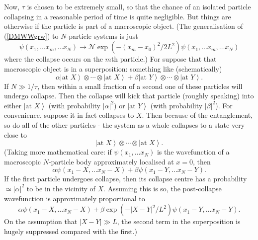 \documentclass[12pt]{article}
\newcommand{\be}{\begin{equation}}
\newcommand{\ee}{\end{equation}}
\newcommand{\mc}[1]{\ensuremath{\mathcal{#1}}}
\newcommand{\ket}[1]{\ensuremath{\left|  #1 \right\rangle}}
\begin{document}
Now, $\tau$ is chosen to be extremely small, so that the chance of an isolated particle collapsing in a reasonable period of time is quite negligible. But things are otherwise if the particle is part of a macroscopic object. (The generalisation of (\ref{DMWWgrw}) to $N$-particle systems is just
\be\label{DMWWgrw2}
\psi(x_1,\ldots x_m, \ldots x_N)\longrightarrow \mc{N}\exp(-(x_m-x_0)^2/2L^2) \psi(x_1,\ldots x_m, \ldots x_N)
\ee 
where the collapse occurs on the $m$th particle.) For suppose that that macroscopic object is in a superposition: something like (schematically)
\be
\alpha \ket{\mathrm{\mbox{at }}X}\otimes \cdots \otimes \ket{\mathrm{\mbox{at }}X}
+ 
\beta \ket{\mathrm{\mbox{at }}Y}\otimes \cdots \otimes \ket{\mathrm{\mbox{at }}Y}.
\ee
If $N \gg 1/\tau$, then within a small fraction of a second one of these particles will undergo collapse. Then the collapse will kick that particle (roughly speaking) into either \ket{\mathrm{\mbox{at }}X} (with probability $|\alpha|^2$) or \ket{\mathrm{\mbox{at }}Y} (with probability $|\beta|^2$).  For convenience, suppose it in fact collapses to $X$. Then because of the entanglement, so do all of the other particles - the system as a whole collapses to a state very close to
\be
\ket{\mathrm{\mbox{at }}X}\otimes \cdots \otimes \ket{\mathrm{\mbox{at }}X}.
\ee
(Taking more mathematical care: if $\psi(x_1, \ldots x_N)$ is the wavefunction of a macroscopic $N$-particle body approximately localised at $x=0$, then 
\be
\alpha \psi(x_1-X, \ldots x_N-X)
+ \beta
\psi(x_1-Y, \ldots x_N-Y).
\ee
If the first particle undergoes collapse, then its collapse centre has a probability $\simeq |\alpha|^2$ to be in the vicinity of $X$. Assuming this is so, the post-collapse wavefunction is approximately proportional to
\be
\alpha 
\psi (x_1-X, \ldots x_N-X)
+
\beta \exp(-|X-Y|^2/L^2)\psi(x_1-Y, \ldots x_N-Y).
\ee
On the assumption that $|X-Y| \gg L$, the second term in the superposition is hugely suppressed compared with the first.)
\end{document}
